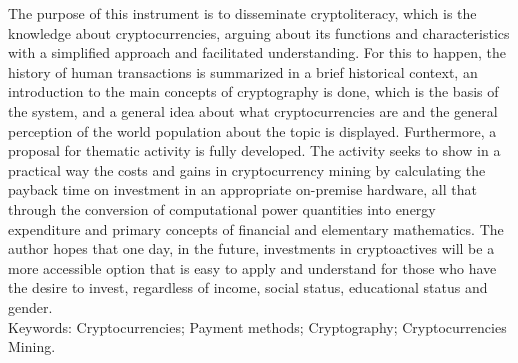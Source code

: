 \begin{KeepFromToc}
The purpose of this instrument is to disseminate cryptoliteracy, which is the knowledge about cryptocurrencies, arguing about its functions and characteristics with a simplified approach and facilitated understanding. For this to happen, the history of human transactions is summarized in a brief historical context, an introduction to the main concepts of cryptography is done, which is the basis of the system, and a general idea about what cryptocurrencies are and the general perception of the world population about the topic is displayed. Furthermore, a proposal for thematic activity is fully developed. The activity seeks to show in a practical way the costs and gains in cryptocurrency mining by calculating the payback time on investment in an appropriate on-premise hardware, all that through the conversion of computational power quantities into energy expenditure and primary concepts of financial and elementary mathematics. The author hopes that one day, in the future, investments in cryptoactives will be a more accessible option that is easy to apply and understand for those who have the desire to invest, regardless of income, social status, educational status and gender.\\

\noindent
Keywords: Cryptocurrencies; Payment methods; Cryptography; Cryptocurrencies Mining.

\end{KeepFromToc}